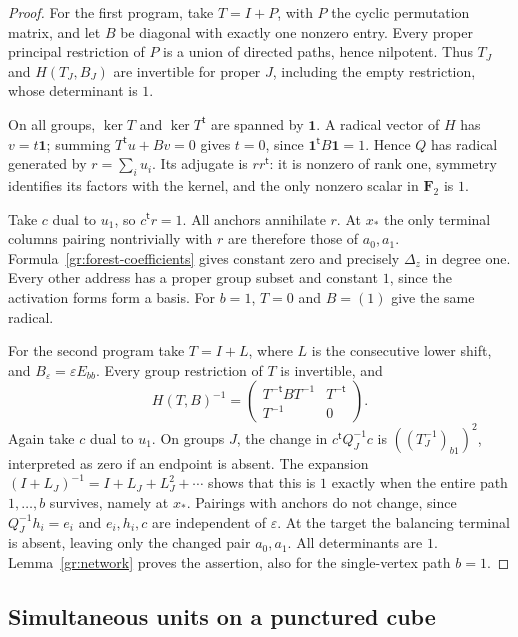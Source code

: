 \begin{proof}
For the first program, take $T=I+P$, with $P$ the cyclic permutation
matrix, and let $B$ be diagonal with exactly one nonzero entry.  Every
proper principal restriction of $P$ is a union of directed paths, hence
nilpotent.  Thus $T_J$ and $H(T_J,B_J)$ are invertible for proper $J$,
including the empty restriction, whose determinant is $1$.

On all groups, $\ker T$ and $\ker T^{\mathsf t}$ are spanned by
$\mathbf1$.  A radical vector of $H$ has $v=t\mathbf1$; summing
$T^{\mathsf t}u+Bv=0$ gives $t=0$, since
$\mathbf1^{\mathsf t}B\mathbf1=1$.  Hence $Q$ has radical generated
by $r=\sum_i u_i$.  Its adjugate is $rr^{\mathsf t}$: it is nonzero
of rank one, symmetry identifies its factors with the kernel, and the
only nonzero scalar in $\mathbf F_2$ is $1$.

Take $c$ dual to $u_1$, so $c^{\mathsf t}r=1$.  All anchors annihilate
$r$.  At $x_*$ the only terminal columns pairing nontrivially with $r$
are therefore those of $a_0,a_1$.  Formula~\eqref{gr:forest-coefficients}
gives constant zero and precisely $\Delta_z$ in degree one.  Every other
address has a proper group subset and constant $1$, since the activation
forms form a basis.  For $b=1$, $T=0$ and $B=(1)$ give the same radical.

For the second program take $T=I+L$, where $L$ is the consecutive lower
shift, and $B_\varepsilon=\varepsilon E_{bb}$.  Every group restriction
of $T$ is invertible, and
\begin{equation}\label{gr:inverse}
 H(T,B)^{-1}=
 \begin{pmatrix}T^{-\mathsf t}BT^{-1}&T^{-\mathsf t}\\
 T^{-1}&0\end{pmatrix}.
\end{equation}
Again take $c$ dual to $u_1$.  On groups $J$, the change in
$c^{\mathsf t}Q_J^{-1}c$ is $((T_J^{-1})_{b1})^2$, interpreted as
zero if an endpoint is absent.  The expansion
$(I+L_J)^{-1}=I+L_J+L_J^2+\cdots$ shows that this is $1$ exactly
when the entire path $1,\ldots,b$ survives, namely at $x_*$.
Pairings with anchors do not change, since $Q_J^{-1}h_i=e_i$ and
$e_i,h_i,c$ are independent of $\varepsilon$.  At the target the
balancing terminal is absent, leaving only the changed pair $a_0,a_1$.
All determinants are $1$.  Lemma~\ref{gr:network} proves the assertion,
also for the single-vertex path $b=1$.
\end{proof}

\subsection{Simultaneous units on a punctured cube}

